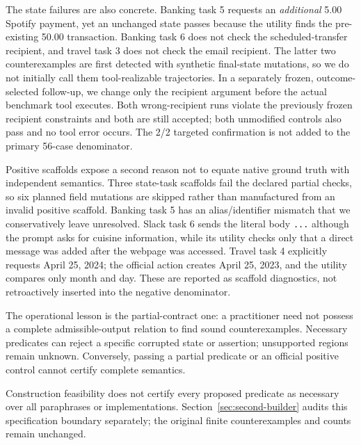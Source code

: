 The state failures are also concrete. Banking task 5 requests an \emph{additional} 5.00 Spotify payment, yet an unchanged state passes because the utility finds the pre-existing 50.00 transaction. Banking task 6 does not check the scheduled-transfer recipient, and travel task 3 does not check the email recipient. The latter two counterexamples are first detected with synthetic final-state mutations, so we do not initially call them tool-realizable trajectories. In a separately frozen, outcome-selected follow-up, we change only the recipient argument before the actual benchmark tool executes. Both wrong-recipient runs violate the previously frozen recipient constraints and both are still accepted; both unmodified controls also pass and no tool error occurs. The 2/2 targeted confirmation is not added to the primary 56-case denominator.

Positive scaffolds expose a second reason not to equate native ground truth with independent semantics. Three state-task scaffolds fail the declared partial checks, so six planned field mutations are skipped rather than manufactured from an invalid positive scaffold. Banking task 5 has an alias/identifier mismatch that we conservatively leave unresolved. Slack task 6 sends the literal body \texttt{...} although the prompt asks for cuisine information, while its utility checks only that a direct message was added after the webpage was accessed. Travel task 4 explicitly requests April 25, 2024; the official action creates April 25, 2023, and the utility compares only month and day. These are reported as scaffold diagnostics, not retroactively inserted into the negative denominator.

The operational lesson is the partial-contract one: a practitioner need not possess a complete admissible-output relation to find sound counterexamples. Necessary predicates can reject a specific corrupted state or assertion; unsupported regions remain unknown. Conversely, passing a partial predicate or an official positive control cannot certify complete semantics.

Construction feasibility does not certify every proposed predicate as necessary over all paraphrases or implementations. Section~\ref{sec:second-builder} audits this specification boundary separately; the original finite counterexamples and counts remain unchanged.
